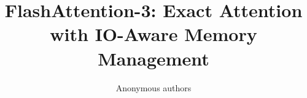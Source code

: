 \title{\textbf{FlashAttention-3: Exact Attention with IO-Aware Memory Management}}

\author{Anonymous authors}
